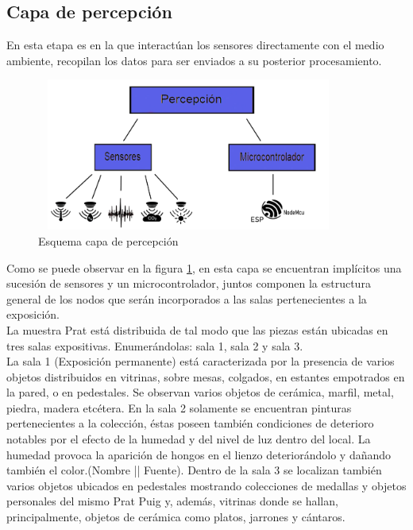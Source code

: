     \subsection{Capa de percepción}\label{subsec:capa_percepcion}
    En esta etapa es en la que interactúan los sensores directamente con el medio ambiente, recopilan los datos para ser enviados a su posterior procesamiento.\\
    
    \begin{figure}[h]
        \centering
        \includegraphics[width=10cm, height=5cm]{imagenes/perception_image.jpg}
        \caption{Esquema capa de percepción}
        \label{imag:capa_percepcion}
    \end{figure}

    Como se puede observar en la figura \ref{imag:capa_percepcion}, en esta capa se encuentran implícitos una sucesión de sensores y un microcontrolador, juntos componen la estructura general de los nodos que serán incorporados a las salas pertenecientes a la exposición.\\

    La muestra Prat está distribuida de tal modo que las piezas están ubicadas en tres salas expositivas. Enumerándolas: sala 1, sala 2 y sala 3.\\
    La sala 1 (Exposición permanente) está caracterizada por la presencia de varios objetos distribuidos en vitrinas, sobre mesas, colgados, en estantes empotrados en la pared, o en pedestales. Se observan varios objetos de cerámica, marfil, metal, piedra, madera etcétera.\newline
    En la sala 2 solamente se encuentran pinturas pertenecientes a la colección, éstas poseen también condiciones de deterioro notables por el efecto de la humedad y del nivel de luz dentro del local. La humedad provoca la aparición de hongos en el lienzo deteriorándolo y dañando también el color. (Nombre || Fuente).\newline
    Dentro de la sala 3 se localizan también varios objetos ubicados en pedestales mostrando colecciones de medallas y objetos personales del mismo Prat Puig y, además, vitrinas donde se hallan, principalmente, objetos de cerámica como platos, jarrones y cántaros.\newline

